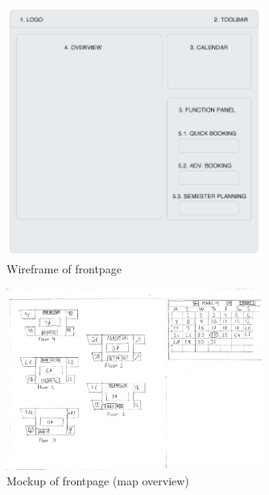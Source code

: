 \begin{figure}
\begin{center}
\leavevmode
\includegraphics[width=0.75\textwidth]{images/wireframe1}
\end{center}
\caption{Wireframe of frontpage}
\label{fig:app1_wire1}
\end{figure}

\begin{figure}
\begin{center}
\leavevmode
\includegraphics[width=0.75\textwidth]{images/overview1}
\end{center}
\caption{Mockup of frontpage (map overview)}
\label{fig:app1_mock2_3}
\end{figure}

